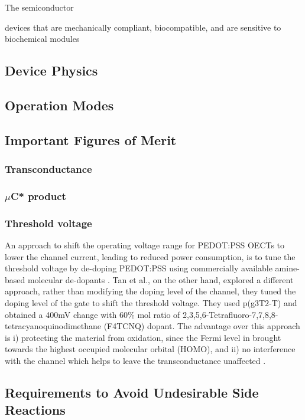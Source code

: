 The semiconductor

devices that are mechanically compliant, biocompatible, and are sensitive to biochemical modules \cite{tanMixedIonicElectronic2022}

\subsection{Device Physics}

\subsection{Operation Modes}

\subsection{Important Figures of Merit}
\subsubsection{Transconductance}
\subsubsection{$\mu$C* product}
\subsubsection{Threshold voltage}

An approach to shift the operating voltage range for PEDOT:PSS OECTs to lower the channel current, leading to reduced power consumption, is to tune the threshold voltage by de-doping PEDOT:PSS using commercially available amine-based molecular de-dopants \cite{Keene_enhmod_pedot}. Tan et al., on the other hand, explored a different approach, rather than modifying the doping level of the channel, they tuned the doping level of the gate to shift the threshold voltage. They used p(g3T2-T) and obtained a 400mV change with 60\% mol ratio of 2,3,5,6-Tetrafluoro-7,7,8,8-tetracyanoquinodimethane (F4TCNQ) dopant. The advantage over this approach is i) protecting the material from oxidation, since the Fermi level in brought towards the highest occupied molecular orbital (HOMO), and ii) no interference with the channel which helps to leave the transconductance unaffected \cite{tanTuningOrganicElectrochemical2022}.

\subsection{Requirements to Avoid Undesirable Side Reactions}


